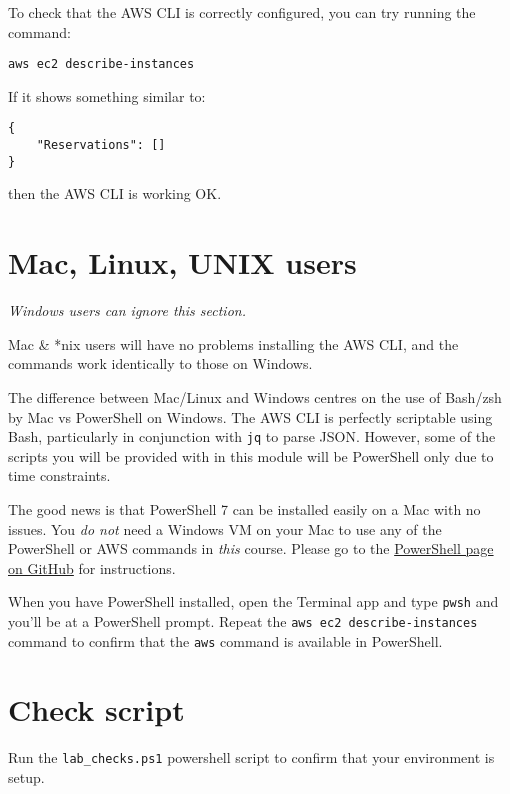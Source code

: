 \documentclass{pgnotes}
\begin{document}
To check that the AWS CLI is correctly configured, you can try running the command:
\begin{verbatim}
aws ec2 describe-instances
\end{verbatim}
If it shows something similar to:
\begin{verbatim}
{
    "Reservations": []
}
\end{verbatim}
then the AWS CLI is working OK.

\section{Mac, Linux, UNIX users}

\textit{Windows users can ignore this section.}

Mac \& *nix users will have no problems installing the AWS CLI, and the commands work identically to those on Windows.

The difference between Mac/Linux and Windows centres on the use of Bash/zsh by Mac vs PowerShell on Windows.
The AWS CLI is perfectly scriptable using Bash, particularly in conjunction with \texttt{jq} to parse JSON.
However, some of the scripts you will be provided with in this module will be PowerShell only due to time constraints.

The good news is that PowerShell 7 can be installed easily on a Mac with no issues.
You \textit{do not} need a Windows VM on your Mac to use any of the PowerShell or AWS commands in \textit{this} course.
Please go to the \href{https://github.com/PowerShell/PowerShell}{PowerShell page on GitHub} for instructions.

When you have PowerShell installed, open the Terminal app and type \texttt{pwsh} and you'll be at a PowerShell prompt.
Repeat the \texttt{aws ec2 describe-instances} command to confirm that the \texttt{aws} command is available in PowerShell. 

\section{Check script}

Run the \texttt{lab\_checks.ps1} powershell script to confirm that your environment is setup. 
\end{document}
